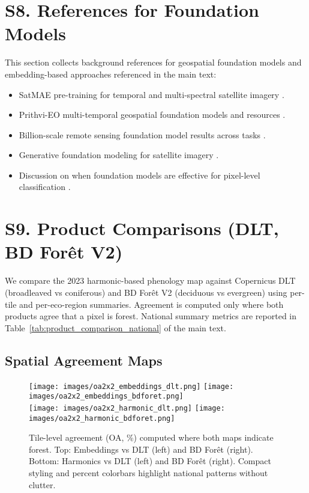 \documentclass[utf8]{frontiers_suppmat}
\begin{document}
\section{S8. References for Foundation Models}

This section collects background references for geospatial foundation models and embedding-based approaches referenced in the main text:

\begin{itemize}
    \item SatMAE pre-training for temporal and multi-spectral satellite imagery \citep{Cong2022}.
    \item Prithvi-EO multi-temporal geospatial foundation models and resources \citep{Szwarcman2024PrithviEO2}.
    \item Billion-scale remote sensing foundation model results across tasks \citep{Cha2023Billion}.
    \item Generative foundation modeling for satellite imagery \citep{Khanna2023DiffusionSat}.
    \item Discussion on when foundation models are effective for pixel-level classification \citep{Xie2024FoundationEffective}.
\end{itemize}

\section{S9. Product Comparisons (DLT, BD For\^{e}t V2)}

We compare the 2023 harmonic-based phenology map against Copernicus DLT (broadleaved vs coniferous) and BD For\^{e}t V2 (deciduous vs evergreen) using per-tile and per-eco-region summaries. Agreement is computed only where both products agree that a pixel is forest. National summary metrics are reported in Table~\ref{tab:product_comparison_national} of the main text.

\subsection{Spatial Agreement Maps}

\begin{figure}[H]
    \centering
    \texttt{[image: images/oa2x2\_embeddings\_dlt.png]}\hfill
    \texttt{[image: images/oa2x2\_embeddings\_bdforet.png]}\\[0.5em]
    \texttt{[image: images/oa2x2\_harmonic\_dlt.png]}\hfill
    \texttt{[image: images/oa2x2\_harmonic\_bdforet.png]}
    \caption{Tile-level agreement (OA, \%) computed where both maps indicate forest. Top: Embeddings vs DLT (left) and BD For\^{e}t (right). Bottom: Harmonics vs DLT (left) and BD For\^{e}t (right). Compact styling and percent colorbars highlight national patterns without clutter.}
    \label{fig:oa2x2_products}
\end{figure}
\end{document}
